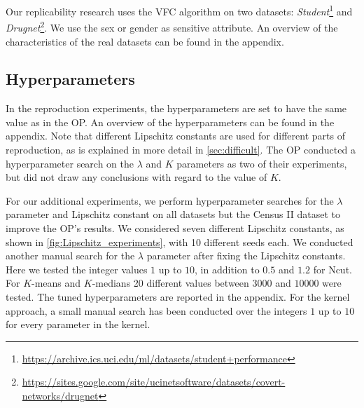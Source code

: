 Our replicability research uses the VFC algorithm on two datasets: \textit{Student}\footnote{\url{https://archive.ics.uci.edu/ml/datasets/student+performance}} and \textit{Drugnet}\footnote{\url{https://sites.google.com/site/ucinetsoftware/datasets/covert-networks/drugnet}}. We use the sex or gender as sensitive attribute. An overview of the characteristics of the real datasets can be found in the appendix.


\subsection{Hyperparameters}
In the reproduction experiments, the hyperparameters are set to have the same value as in the OP. An overview of the hyperparameters can be found in the appendix. Note that different Lipschitz constants are used for different parts of reproduction, as is explained in more detail in \autoref{sec:difficult}. The OP conducted a hyperparameter search on the $\lambda$ and $K$ parameters as two of their experiments, but did not draw any conclusions with regard to the value of $K$. 

For our additional experiments, we perform hyperparameter searches for the $\lambda$ parameter and Lipschitz constant on all datasets but the Census II dataset to improve the OP's results. We considered seven different Lipschitz constants, as shown in \autoref{fig:Lipschitz_experiments}, with 10 different seeds each. We conducted another manual search for the $\lambda$ parameter after fixing the Lipschitz constants. Here we tested the integer values $1$ up to $10$, in addition to $0.5$ and $1.2$ for Ncut. For $K$-means and $K$-medians 20 different values between $3000$ and $10000$ were tested. The tuned hyperparameters are reported in the appendix. For the kernel approach, a small manual search has been conducted over the integers $1$ up to $10$ for every parameter in the kernel.

